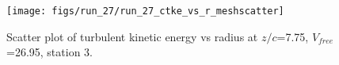 \begin{figure}[H]
\centering
\texttt{[image: figs/run\_27/run\_27\_ctke\_vs\_r\_meshscatter]}
\caption{Scatter plot of turbulent kinetic energy vs radius at $z/c$=7.75, $V_{free}$=26.95, station 3.}
\label{fig:run_27_ctke_vs_r_meshscatter}
\end{figure}


